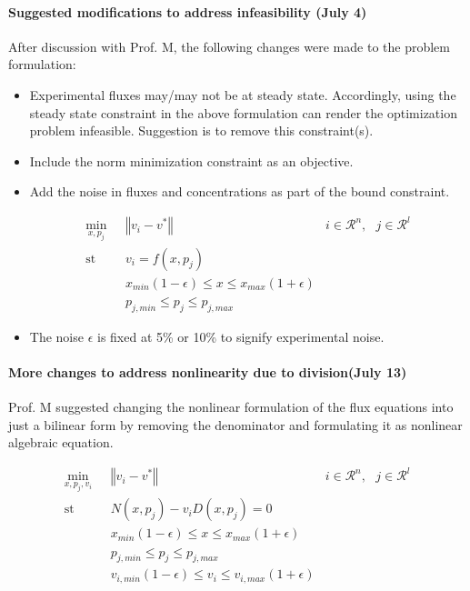 \documentclass[10pt]{report}
\begin{document}
	\paragraph{Suggested modifications to address infeasibility (July 4)}
	After discussion with Prof. M, the following changes were made to the problem formulation:
	\begin{itemize}
		\item Experimental fluxes may/may not be at steady state. Accordingly, using the steady state constraint in the above formulation can render the optimization problem infeasible. Suggestion is to remove this constraint(s).
		\item Include the norm minimization constraint as an objective.
		\item Add the noise in fluxes and concentrations as part of the bound constraint.
		\begin{center}
			\begin{subequations}
				\begin{align}
				\underset{x,p_j}{\mathrm{min}} & \text{      }\left\Vert v_i-v^*\right\Vert &  i\in\mathcal{R}^n,\text{  }j\in\mathcal{R}^l\\
				\mathrm{st}& \text{      }v_i = f(x,p_j)\\
				& \text{      }x_{min}(1-\epsilon)\le x \le x_{max}(1+\epsilon)\\
				& \text{      }p_{j,min} \le p_j \le p_{j,max}
				\end{align}
			\end{subequations}
		\end{center}
	\item The noise $\epsilon$ is fixed at 5\% or 10\% to signify experimental noise.
	\end{itemize}

	\paragraph{More changes to address nonlinearity due to division(July 13)}
	Prof. M suggested changing the nonlinear formulation of the flux equations into just a bilinear form by removing the denominator and formulating it as nonlinear algebraic equation.
	\begin{center}
		\begin{subequations}
			\begin{align}
			\underset{x,p_j,v_i}{\mathrm{min}} & \text{      }\left\Vert v_i-v^*\right\Vert &  i\in\mathcal{R}^n,\text{  }j\in\mathcal{R}^l\\
			\mathrm{st}& \text{      }N(x,p_j) - v_iD(x,p_j) = 0\\
			& \text{      }x_{min}(1-\epsilon)\le x \le x_{max}(1+\epsilon)\\			
			& \text{      }p_{j,min} \le p_j \le p_{j,max}\\
			& \text{      }v_{i,min}(1-\epsilon)\le v_i \le v_{i,max}(1+\epsilon)
			\end{align}
		\end{subequations}
	\end{center}
\end{document}
